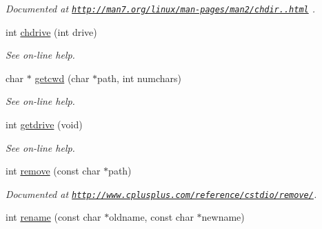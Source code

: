 \begin{DoxyCompactItemize}
\begin{DoxyCompactList}\small\item\em Documented at \href{http://man7.org/linux/man-pages/man2/chdir.2.html}{\tt http\-://man7.\-org/linux/man-\/pages/man2/chdir..\-html} . \end{DoxyCompactList}\item 
\hypertarget{group__process_gafb9b67085ccc81981d853faca68f821c}{int \hyperlink{group__process_gafb9b67085ccc81981d853faca68f821c}{chdrive} (int drive)}\label{group__process_gafb9b67085ccc81981d853faca68f821c}

\begin{DoxyCompactList}\small\item\em See on-\/line help. \end{DoxyCompactList}\item 
\hypertarget{group__process_ga169aa64ffbd2fb36997ab67e03a95dfb}{char $\ast$ \hyperlink{group__process_ga169aa64ffbd2fb36997ab67e03a95dfb}{getcwd} (char $\ast$path, int numchars)}\label{group__process_ga169aa64ffbd2fb36997ab67e03a95dfb}

\begin{DoxyCompactList}\small\item\em See on-\/line help. \end{DoxyCompactList}\item 
\hypertarget{group__process_ga5e4a8d72a7f09af71e98f4735c2cbc9b}{int \hyperlink{group__process_ga5e4a8d72a7f09af71e98f4735c2cbc9b}{getdrive} (void)}\label{group__process_ga5e4a8d72a7f09af71e98f4735c2cbc9b}

\begin{DoxyCompactList}\small\item\em See on-\/line help. \end{DoxyCompactList}\item 
\hypertarget{group__process_ga32e4cef9beb0262cea4bdafb5b998276}{int \hyperlink{group__process_ga32e4cef9beb0262cea4bdafb5b998276}{remove} (const char $\ast$path)}\label{group__process_ga32e4cef9beb0262cea4bdafb5b998276}

\begin{DoxyCompactList}\small\item\em Documented at \href{http://www.cplusplus.com/reference/cstdio/remove/}{\tt http\-://www.\-cplusplus.\-com/reference/cstdio/remove/}. \end{DoxyCompactList}\item 
\hypertarget{group__process_gaffd46c92931ef1c646e1a78ab880a00e}{int \hyperlink{group__process_gaffd46c92931ef1c646e1a78ab880a00e}{rename} (const char $\ast$oldname, const char $\ast$newname)}\label{group__process_gaffd46c92931ef1c646e1a78ab880a00e}


\end{DoxyCompactItemize}
